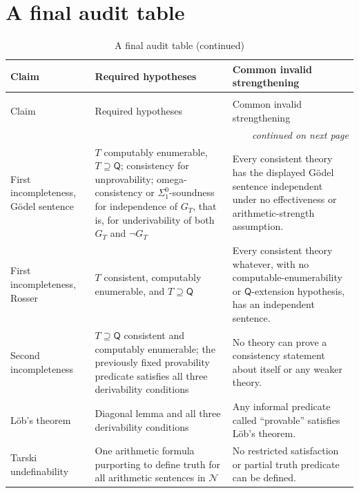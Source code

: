 \section{A final audit table}
\label{sec:second-incompleteness-05}

\begin{longtable}{@{}p{}p{}p{}@{}}
\caption{A final audit table}\\
\toprule
Claim & Required hypotheses & Common invalid strengthening \\
\midrule
\endfirsthead
\caption[]{A final audit table (continued)}\\
\toprule
Claim & Required hypotheses & Common invalid strengthening \\
\midrule
\endhead
\midrule\multicolumn{3}{r}{\emph{continued on next page}}\\
\endfoot
\endlastfoot
First incompleteness, G\"odel sentence & \(T\) computably enumerable,
\(T\supseteq\mathsf Q\); consistency for unprovability; omega-consistency or
\(\Sigma^0_1\)-soundness for independence of \(G_T\), that is, for
underivability of both \(G_T\) and \(\neg G_T\) & Every consistent theory
has the displayed G\"odel sentence independent under no effectiveness or
arithmetic-strength assumption. \\
\addlinespace
First incompleteness, Rosser & \(T\) consistent, computably enumerable, and
\(T\supseteq\mathsf Q\) & Every consistent theory whatever, with no
computable-enumerability or \(\mathsf Q\)-extension hypothesis, has an
independent sentence. \\
\addlinespace
Second incompleteness & \(T\supseteq\mathsf Q\) consistent and computably
enumerable; the previously fixed provability predicate satisfies all three
derivability conditions &
No theory can prove a consistency statement about itself or any weaker theory.
\\
\addlinespace
L\"ob's theorem & Diagonal lemma and all three derivability conditions & Any
informal predicate called ``provable'' satisfies L\"ob's theorem. \\
\addlinespace
Tarski undefinability & One arithmetic formula purporting to define truth for
all arithmetic sentences in \(\mathcal N\) & No restricted satisfaction or
partial truth predicate can be defined. \\
\bottomrule
\end{longtable}

